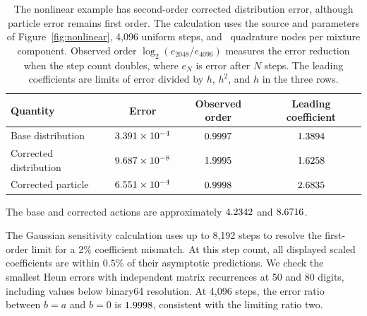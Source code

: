 \begin{table}[!ht]
\centering
\caption{The nonlinear example has second-order corrected distribution error, although particle error remains first order. The calculation uses the source and parameters of Figure~\ref{fig:nonlinear}, 4,096 uniform steps, and \NonlinearQuadratureOrder\ quadrature nodes per mixture component. Observed order $\log_2(e_{2048}/e_{4096})$ measures the error reduction when the step count doubles, where $e_N$ is error after $N$ steps. The leading coefficients are limits of error divided by $h$, $h^2$, and $h$ in the three rows.}
\label{tab:nonlinear-results}
\begin{tabular}{lccc}
\toprule
Quantity & Error & Observed order & Leading coefficient\\
\midrule
Base distribution & $3.391\times 10^{-4}$ & $0.9997$ & $1.3894$\\
Corrected distribution & $9.687\times 10^{-8}$ & $1.9995$ & $1.6258$\\
Corrected particle & $6.551\times 10^{-4}$ & $0.9998$ & $2.6835$\\
\bottomrule
\end{tabular}
\end{table}

\FloatBarrier
The base and corrected actions are approximately $4.2342$ and $8.6716$. 

The Gaussian sensitivity calculation uses up to 8,192 steps to resolve the first-order limit for a 2\% coefficient mismatch. At this step count, all displayed scaled coefficients are within $0.5\%$ of their asymptotic predictions. We check the smallest Heun errors with independent matrix recurrences at 50 and 80 digits, including values below binary64 resolution. At 4,096 steps, the error ratio between $b=a$ and $b=0$ is $1.9998$, consistent with the limiting ratio two.






\FloatBarrier
